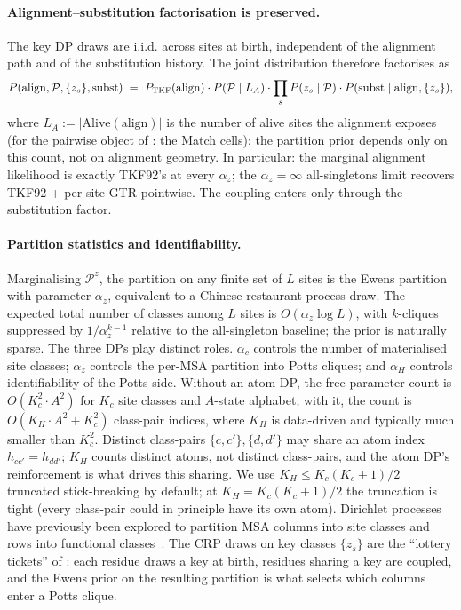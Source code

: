 \documentclass[11pt]{article}
\theoremstyle{definition}
\theoremstyle{remark}
\newcommand{\TKF}{\textsc{TKF}}
\newcommand{\partition}{\mathcal{P}}
\begin{document}
\paragraph{Alignment--substitution factorisation is preserved.}
The key DP draws are i.i.d. across sites at birth, independent of the
alignment path and of the substitution history. The joint
distribution therefore factorises as
\begin{equation}
\label{eq:factorisation}
P(\mathrm{align}, \partition, \{z_s\}, \mathrm{subst})
  \;=\; P_{\TKF}(\mathrm{align}) \cdot P(\partition \mid L_A) \cdot \prod_s P(z_s \mid \partition) \cdot P(\mathrm{subst} \mid \mathrm{align}, \{z_s\}),
\end{equation}
where $L_A := |\mathrm{Alive}(\mathrm{align})|$ is the number of
alive sites the alignment exposes (for the pairwise object of
: the Match cells); the partition prior
depends only on this count, not on alignment geometry. In particular: the
marginal alignment likelihood is exactly TKF92's at every $\alpha_z$;
the $\alpha_z = \infty$ all-singletons limit recovers TKF92 + per-site
GTR pointwise. The coupling enters only through the substitution
factor.

\paragraph{Partition statistics and identifiability.}
Marginalising $\partition^z$, the partition on any finite set of $L$ sites
is the Ewens partition with parameter $\alpha_z$, equivalent to a
Chinese restaurant process draw. The expected total number of classes among $L$ sites is
$O(\alpha_z \log L)$, with $k$-cliques suppressed by
$1/\alpha_z^{k-1}$ relative to the all-singleton baseline; the
prior is naturally sparse. The three DPs play distinct roles. $\alpha_c$
controls the number of materialised site classes; $\alpha_z$ controls
the per-MSA partition into Potts cliques; and $\alpha_H$ controls
identifiability of the Potts side. Without an atom DP, the free
parameter count is $O(K_c^2 \cdot A^2)$ for $K_c$ site classes and
$A$-state alphabet; with it, the count is $O(K_H \cdot A^2 + K_c^2)$
class-pair indices, where $K_H$ is data-driven and typically much
smaller than $K_c^2$. Distinct class-pairs $\{c, c'\}, \{d, d'\}$
may share an atom index $h_{cc'} = h_{dd'}$; $K_H$ counts distinct
atoms, not distinct class-pairs, and the atom DP's reinforcement
is what drives this sharing.
We use $K_H \le K_c(K_c+1)/2$ truncated
stick-breaking by default; at $K_H = K_c(K_c+1)/2$ the truncation
is tight (every class-pair could in principle have its own atom).
Dirichlet processes have previously been explored to partition MSA columns into site classes and rows into functional classes~\cite{huelsenbeck2006,huelsenbeck2007,brown2008,nguyen2013,rodrigue2021}.
The CRP draws on key classes $\{z_s\}$ are the
``lottery tickets'' of : each residue
draws a key at birth, residues sharing a key are coupled, and the
Ewens prior on the resulting partition is what selects which
columns enter a Potts clique.
\end{document}
